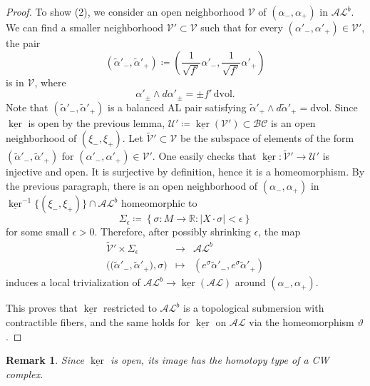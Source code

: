 \documentclass[letterpaper, 11pt]{article}
\numberwithin{equation}{section}
\newtheorem{rem}[thm]{Remark}
\newcommand{\R}{\mathbb{R}}
\begin{document}
\begin{proof}
To show (2), we consider an open neighborhood $\mathcal{V}$ of $(\alpha_-, \alpha_+)$ in $\mathcal{AL}^b$. We can find a smaller neighborhood $\mathcal{V}' \subset \mathcal{V}$ such that for every $(\alpha'_-, \alpha'_+) \in \mathcal{V}'$, the pair 
$$\left(\widetilde{\alpha}'_-, \widetilde{\alpha}'_+\right) \coloneqq \left( \frac{1}{\sqrt{f'}} \alpha'_-, \frac{1}{\sqrt{f'}} \alpha'_+ \right)$$
is in $\mathcal{V}$, where 
$$ \alpha'_\pm \wedge d\alpha'_\pm = \pm f' \, \mathrm{dvol}.$$
Note that $\left(\widetilde{\alpha}'_-, \widetilde{\alpha}'_+\right)$ is a balanced AL pair satisfying $\widetilde{\alpha}'_+ \wedge d \widetilde{\alpha}'_+ = \mathrm{dvol}$. Since $\underline{\ker}$ is open by the previous lemma, $\mathcal{U}' \coloneqq \underline{\ker}(\mathcal{V}') \subset \mathcal{BC}$ is an open neighborhood of $(\xi_-, \xi_+)$. Let $\widetilde{\mathcal{V}}' \subset \mathcal{V}$ be the subspace of elements of the form $\left(\widetilde{\alpha}'_-, \widetilde{\alpha}'_+\right)$ for $(\alpha'_-, \alpha'_+) \in \mathcal{V}'$. One easily checks that $\underline{\ker} : \widetilde{\mathcal{V}}' \rightarrow \mathcal{U}'$ is injective and open. It is surjective by definition, hence it is a homeomorphism. By the previous paragraph, there is an open neighborhood of $(\alpha_-, \alpha_+)$ in $\underline{\ker}^{-1}\big\{(\xi_-, \xi_+)\big\} \cap \mathcal{AL}^b$ homeomorphic to 
$$\Sigma_\epsilon \coloneqq \left\{ \sigma : M \rightarrow \R  :  \vert X \cdot \sigma \vert < \epsilon \right\}$$
for some small $\epsilon > 0$. Therefore, after possibly shrinking $\epsilon$, the map
$$\begin{array}{ccc}
\widetilde{\mathcal{V}}' \times \Sigma_\epsilon & \longrightarrow & \mathcal{AL}^b\\
\big(\big(\widetilde{\alpha}'_-, \widetilde{\alpha}'_+\big), \sigma \big) & \longmapsto & \left(e^\sigma \widetilde{\alpha}'_-,  e^\sigma \widetilde{\alpha}'_+ \right)
\end{array}$$
induces a local trivialization of $\mathcal{AL}^b \rightarrow \underline{\ker}\left(\mathcal{AL} \right)$ around $(\alpha_-, \alpha_+)$.

This proves that $\underline{\ker}$ restricted to $\mathcal{AL}^b$ is a topological submersion with contractible fibers, and the same holds for $\underline{\ker}$ on $\mathcal{AL}$ via the homeomorphism $\vartheta$.
\end{proof}

\begin{rem}
Since $\underline{\ker}$ is open, its image has the homotopy type of a CW complex.
\end{rem}
\end{document}
